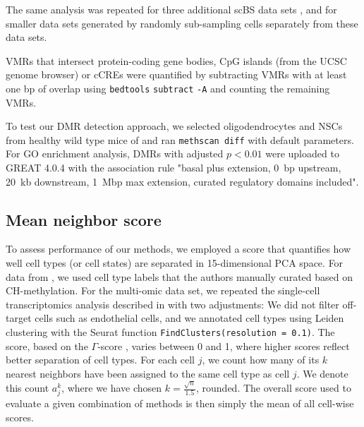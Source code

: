 \documentclass[10pt]{article}
\begin{document}
The same analysis was repeated for three additional scBS data sets \citep{luo2017single, bian2018single, argelaguet2019gastru}, and for smaller data sets generated by randomly sub-sampling cells separately from these data sets.

VMRs that intersect protein-coding gene bodies, CpG islands (from the UCSC genome browser) or cCREs were quantified by subtracting VMRs with at least one bp of overlap using \texttt{bedtools} \texttt{subtract} \texttt{-A} \citep{quinlan2010bedtools} and counting the remaining VMRs.


To test our DMR detection approach, we selected oligodendrocytes and NSCs from healthy wild type mice of \citet{kremer_scnmt} and ran \texttt{methscan diff} with default parameters.
For GO enrichment analysis, DMRs with adjusted $p<0.01$ were uploaded to GREAT 4.0.4 \citep{mclean2010great} with the association rule "basal plus extension, 0~bp upstream, 20~kb downstream, 1~Mbp max extension, curated regulatory domains included".

\subsection*{Mean neighbor score} \label{methods:score}
To assess performance of our methods, we employed a score that quantifies how well cell types (or cell states) are separated in 15-dimensional PCA space.
For data from \citet{luo2017single}, we used cell type labels that the authors manually curated based on CH-methylation.
For the multi-omic data set, we repeated the single-cell transcriptomics analysis described in \citet{kremer_scnmt} with two adjustments:
We did not filter off-target cells such as endothelial cells, and we annotated cell types using Leiden clustering with the Seurat \citep{seurat} function \texttt{FindClusters(resolution = 0.1)}.
The score, based on the $\Gamma$-score \citep{Kireeva_2014}, varies between 0 and 1, where higher scores reflect better separation of cell types.
For each cell $j$, we count how many of its $k$ nearest neighbors have been assigned to the same cell type as cell $j$.
We denote this count $a^k_j$, where we have chosen $k=\frac{\sqrt{n}}{1.5}$, rounded.
The overall score used to evaluate a given combination of methods is then simply the mean of all cell-wise scores.
\end{document}
